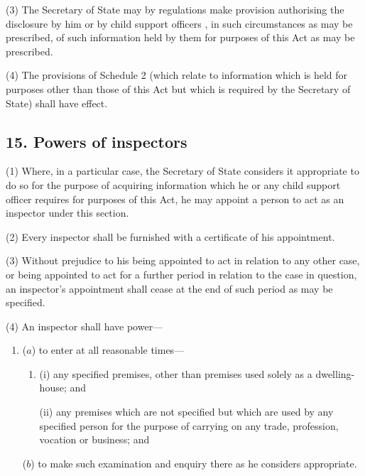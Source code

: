 \documentclass[12pt,a4paper]{article}
\begin{document}
(3) The Secretary of State may by regulations make provision authorising the disclosure by him 
or by child support officers%
, in such circumstances as may be prescribed, of such information held by 
them 
for purposes of this Act as may be prescribed.

(4) The provisions of Schedule 2 (which relate to information which is held for purposes other than those of this Act but which is required by the Secretary of State) shall have effect.


\subsection{15. Powers of inspectors}

(1) Where, in a particular case, the Secretary of State considers it appropriate to do so for the purpose of acquiring information which he 
or any child support officer  %
requires for purposes of this Act, he may appoint a person to act as an inspector under this section.

(2) Every inspector shall be furnished with a certificate of his appointment.

(3) Without prejudice to his being appointed to act in relation to any other case, or being appointed to act for a further period in relation to the case in question, an inspector’s appointment shall cease at the end of such period as may be specified.

(4) An inspector shall have power—
\begin{enumerate}\item[]
($a$) to enter at all reasonable times—
\begin{enumerate}\item[]
(i) any specified premises, other than premises used solely as a dwelling-house; and

(ii) any premises which are not specified but which are used by any specified person for the purpose of carrying on any trade, profession, vocation or business; and
\end{enumerate}

($b$) to make such examination and enquiry there as he considers appropriate.
\end{enumerate}
\end{document}
